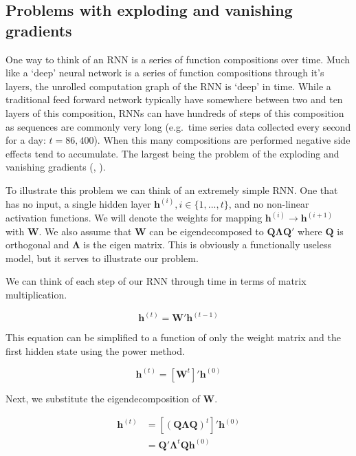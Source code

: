 \documentclass[]{book}
\theoremstyle{definition}
\theoremstyle{definition}
\theoremstyle{definition}
\theoremstyle{remark}
\begin{document}
\subsection{Problems with exploding and vanishing
gradients}\label{problems-with-exploding-and-vanishing-gradients}

One way to think of an RNN is a series of function compositions over
time. Much like a `deep' neural network is a series of function
compositions through it's layers, the unrolled computation graph of the
RNN is `deep' in time. While a traditional feed forward network
typically have somewhere between two and ten layers of this composition,
RNNs can have hundreds of steps of this composition as sequences are
commonly very long (e.g.~time series data collected every second for a
day: \(t= 86,400\)). When this many compositions are performed negative
side effects tend to accumulate. The largest being the problem of the
exploding and vanishing gradients (\citet{vanishing_gradient},
\citet{bengio_gradient}).

To illustrate this problem we can think of an extremely simple RNN. One
that has no input, a single hidden layer
\(\mathbf{h}^{(i)}, i \in \{1, ..., t\}\), and no non-linear activation
functions. We will denote the weights for mapping
\(\mathbf{h}^{(i)} \to \mathbf{h}^{(i + 1)}\) with \(\mathbf{W}\). We
also assume that \(\mathbf{W}\) can be eigendecomposed to
\(\mathbf{Q}\mathbf{\Lambda}\mathbf{Q}'\) where \(\mathbf{Q}\) is
orthogonal and \(\mathbf{\Lambda}\) is the eigen matrix. This is
obviously a functionally useless model, but it serves to illustrate our
problem.

We can think of each step of our RNN through time in terms of matrix
multiplication.

\begin{equation} 
  \mathbf{h}^{(t)} = \mathbf{W}' \mathbf{h}^{(t - 1)}
  \label{eq:simplernn1}
\end{equation}

This equation can be simplified to a function of only the weight matrix
and the first hidden state using the power method.

\begin{equation} 
  \mathbf{h}^{(t)} = \left[\mathbf{W}^t\right]' \mathbf{h}^{(0)}
  \label{eq:simplernn2}
\end{equation}

Next, we substitute the eigendecomposition of \(\mathbf{W}\).

\begin{align} 
  \mathbf{h}^{(t)} &= \left[(\mathbf{Q}\mathbf{\Lambda}\mathbf{Q})^t\right]' \mathbf{h}^{(0)} \\
                    &= \mathbf{Q}'\mathbf{\Lambda}^t \mathbf{Q} \mathbf{h}^{(0)} \\
  \label{eq:simplernn3}
\end{align}
\end{document}
